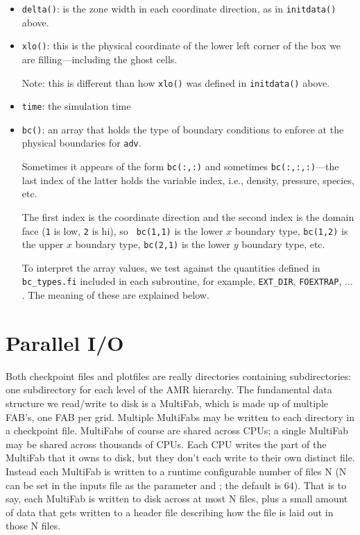\begin{itemize}
\begin{itemize}
  \item {\tt delta()}: is the zone width in each coordinate direction,
    as in {\tt initdata()} above.

  \item {\tt xlo()}: this is the physical coordinate of the lower
    left corner of the box we are filling---including the ghost cells.

    Note: this is different than how {\tt xlo()} was defined in
    {\tt initdata()} above.

  \item {\tt time}: the simulation time

  \item {\tt bc()}: an array that holds the type of boundary conditions
    to enforce at the physical boundaries for {\tt adv}.

    Sometimes it appears of the form {\tt bc(:,:)} and sometimes
    {\tt bc(:,:,:)}---the last index of the latter holds the variable
    index, i.e., density, pressure, species, etc.

    The first index is the coordinate direction and the second index
    is the domain face ({\tt 1} is low, {\tt 2} is hi), so {\tt
    bc(1,1)} is the lower $x$ boundary type, {\tt bc(1,2)} is
    the upper $x$ boundary type, {\tt bc(2,1)} is the lower
    $y$ boundary type, etc.

    To interpret the array values, we test against the quantities
    defined in {\tt bc\_types.fi} included in each subroutine,
    for example, {\tt EXT\_DIR}, {\tt FOEXTRAP}, $\ldots$.  The
    meaning of these are explained below.

  \end{itemize}

\end{itemize}


\section{Parallel I/O}

Both checkpoint files and plotfiles are really directories containing
subdirectories: one subdirectory for each level of the AMR hierarchy.
The fundamental data structure we read/write to disk is a MultiFab,
which is made up of multiple FAB's, one FAB per grid.  Multiple
MultiFabs may be written to each directory in a checkpoint file.
MultiFabs of course are shared across CPUs; a single MultiFab may be
shared across thousands of CPUs.  Each CPU writes the part of the
MultiFab that it owns to disk, but they don't each write to their own
distinct file.  Instead each MultiFab is written to a runtime
configurable number of files N (N can be set in the inputs file as the
parameter  and ; the
default is 64).  That is to say, each MultiFab is written to disk
across at most N files, plus a small amount of data that gets written
to a header file describing how the file is laid out in those N files.

